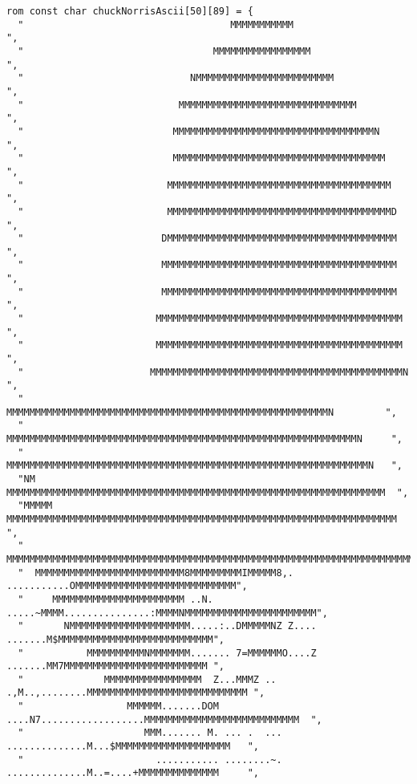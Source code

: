 \begin{lstlisting}
rom const char chuckNorrisAscii[50][89] = {
  "                                    MMMMMMMMMMM                                         ",
  "                                 MMMMMMMMMMMMMMMMM                                      ",
  "                             NMMMMMMMMMMMMMMMMMMMMMMMM                                  ",
  "                           MMMMMMMMMMMMMMMMMMMMMMMMMMMMMMM                              ",
  "                          MMMMMMMMMMMMMMMMMMMMMMMMMMMMMMMMMMMN                          ",
  "                          MMMMMMMMMMMMMMMMMMMMMMMMMMMMMMMMMMMMM                         ",
  "                         MMMMMMMMMMMMMMMMMMMMMMMMMMMMMMMMMMMMMMM                        ",
  "                         MMMMMMMMMMMMMMMMMMMMMMMMMMMMMMMMMMMMMMMD                       ",
  "                        DMMMMMMMMMMMMMMMMMMMMMMMMMMMMMMMMMMMMMMMM                       ",
  "                        MMMMMMMMMMMMMMMMMMMMMMMMMMMMMMMMMMMMMMMMM                       ",
  "                        MMMMMMMMMMMMMMMMMMMMMMMMMMMMMMMMMMMMMMMMM                       ",
  "                       MMMMMMMMMMMMMMMMMMMMMMMMMMMMMMMMMMMMMMMMMMM                      ",
  "                       MMMMMMMMMMMMMMMMMMMMMMMMMMMMMMMMMMMMMMMMMMM                      ",
  "                      MMMMMMMMMMMMMMMMMMMMMMMMMMMMMMMMMMMMMMMMMMMMN                     ",
  "                      MMMMMMMMMMMMMMMMMMMMMMMMMMMMMMMMMMMMMMMMMMMMMMMMMMMMMMMMN         ",
  "                     MMMMMMMMMMMMMMMMMMMMMMMMMMMMMMMMMMMMMMMMMMMMMMMMMMMMMMMMMMMMMN     ",
  "                     MMMMMMMMMMMMMMMMMMMMMMMMMMMMMMMMMMMMMMMMMMMMMMMMMMMMMMMMMMMMMMMN   ",
  "NM                  MMMMMMMMMMMMMMMMMMMMMMMMMMMMMMMMMMMMMMMMMMMMMMMMMMMMMMMMMMMMMMMMMM  ",
  "MMMMM              MMMMMMMMMMMMMMMMMMMMMMMMMMMMMMMMMMMMMMMMMMMMMMMMMMMMMMMMMMMMMMMMMMMM ",
  " MMMMMMMMMMMMMMMMMMMMMMMMMMMMMMMMMMMMMMMMMMMMMMMMMMMMMMMMMMMMMMMMMMMMMMMMMMMMMMMMMMMMMMM",
  "  MMMMMMMMMMMMMMMMMMMMMMMMMM8MMMMMMMMMIMMMMM8,. ...........OMMMMMMMMMMMMMMMMMMMMMMMMMMMM",
  "     MMMMMMMMMMMMMMMMMMMMMMM ..N. .....~MMMM...............:MMMMNMMMMMMMMMMMMMMMMMMMMMMM",
  "       NMMMMMMMMMMMMMMMMMMMMM.....:..DMMMMMNZ Z.... .......M$MMMMMMMMMMMMMMMMMMMMMMMMMMM",
  "           MMMMMMMMMMNMMMMMMM....... 7=MMMMMMO....Z .......MM7MMMMMMMMMMMMMMMMMMMMMMMMM ",
  "              MMMMMMMMMMMMMMMMM  Z...MMMZ .. .,M..,........MMMMMMMMMMMMMMMMMMMMMMMMMMMM ",
  "                  MMMMMM.......DOM ....N7..................MMMMMMMMMMMMMMMMMMMMMMMMMMM  ",
  "                     MMM....... M. ... .  ... ..............M...$MMMMMMMMMMMMMMMMMMMM   ",
  "                       ........... ........~. ..............M..=....+MMMMMMMMMMMMMM     ",

\end{lstlisting}
